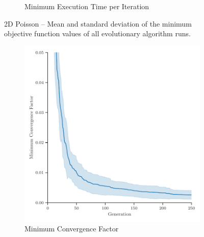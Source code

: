 \begin{figure}[h]
\begin{subfigure}[b]{0.49\textwidth}
		\caption{Minimum Execution Time per Iteration}
		\label{fig:poisson-2D-minimum-execution-time}
	\end{subfigure}
	\caption{2D Poisson -- Mean and standard deviation of the minimum objective function values of all evolutionary algorithm runs.}
	\label{fig:poisson-2D-minimum-objectives}
\end{figure}
\begin{figure}
	\centering
	\begin{subfigure}[b]{0.49\textwidth}
		\centering
		\includegraphics[width=\textwidth]{figures/minimum_convergence_factor_3D_FD_Poisson_fromL2.pdf}
		\caption{Minimum Convergence Factor}
		\label{fig:poisson-3D-minimum-convergence-factor}
	\end{subfigure}
	\hfill
	\begin{subfigure}[b]{0.49\textwidth}
		\centering

\end{subfigure}
\end{figure}
